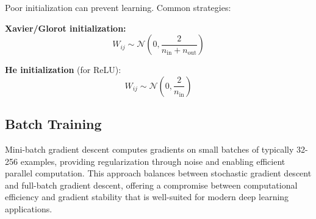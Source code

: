 Poor initialization can prevent learning. Common strategies:

\textbf{Xavier/Glorot initialization:}
\begin{equation}
W_{ij} \sim \mathcal{N}\left(0, \frac{2}{n_{\text{in}} + n_{\text{out}}}\right)
\end{equation}

\textbf{He initialization} (for ReLU):
\begin{equation}
W_{ij} \sim \mathcal{N}\left(0, \frac{2}{n_{\text{in}}}\right)
\end{equation}

\subsection{Batch Training}

Mini-batch gradient descent computes gradients on small batches of typically 32-256 examples, providing regularization through noise and enabling efficient parallel computation. This approach balances between stochastic gradient descent and full-batch gradient descent, offering a compromise between computational efficiency and gradient stability that is well-suited for modern deep learning applications.

